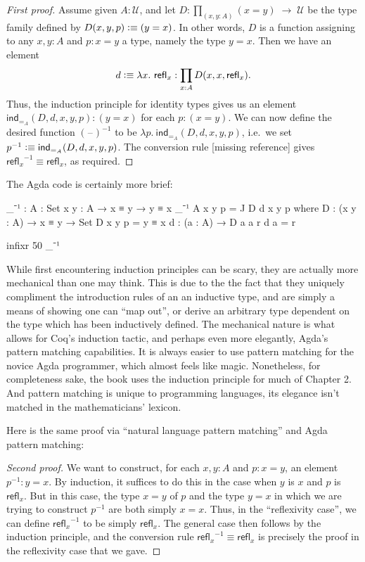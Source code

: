 \documentclass[11pt, a4paper]{article}
\newtheorem{proof}{Proof}
\newcommand{\jdeq}{\equiv}      %
\newcommand{\refl}[1]{\ensuremath{\mathsf{refl}_{#1}}\xspace}
\newcommand{\defeq}{\vcentcolon\equiv}  %
\newcommand{\ind}[1]{\mathsf{ind}_{#1}}
\newcommand{\indid}[1]{\ind{=_{#1}}} %
\newcommand{\blank}{\mathord{\hspace{1pt}\text{--}\hspace{1pt}}}
\newcommand{\opp}[1]{\mathord{{#1}^{-1}}}
\newcommand{\UU}{\ensuremath{\mathcal{U}}\xspace}
\let\type\UU
\begin{document}
\begin{proof}[First proof]
  Assume given $A:\UU$, and
  let $D:{\textstyle\prod_{(x,y:A)}}(x= y) \; \to \; \type$ be the type family defined by $D(x,y,p)\defeq (y= x)$.
  In other words, $D$ is a function assigning to any $x,y:A$ and $p:x=y$ a type, namely the type $y=x$.
  Then we have an element
  \begin{equation*}
    d\defeq \lambda x.\ \refl{x}:\prod_{x:A} D(x,x,\refl{x}).
  \end{equation*}
  Thus, the induction principle for identity types gives us an element
  $\indid{A}(D,d,x,y,p): (y= x)$
  for each $p:(x= y)$.
  We can now define the desired function $\opp{(\blank)}$ to be 
  $\lambda p.\ \indid{A}(D,d,x,y,p)$, 
  i.e.\ we set 
  $\opp{p} \defeq \indid{A}(D,d,x,y,p)$.
  The conversion rule [missing reference] %
  gives $\opp{\refl{x}}\jdeq \refl{x}$, as required.
\end{proof}
The Agda code is certainly more brief: 
\begin{code}

  _⁻¹ : {A : Set} {x y : A} → x ≡ y → y ≡ x
  _⁻¹ {A} {x} {y} p = J D d x y p
    where
      D : (x y : A) → x ≡ y → Set
      D x y p = y ≡ x
      d : (a : A) → D a a r
      d a = r

  infixr 50 _⁻¹

\end{code}

While first encountering induction principles can be scary, they are actually
more mechanical than one may think. This is due to the the fact that they
uniquely compliment the introduction rules of an an inductive type, and are
simply a means of showing one can ``map out'', or derive an arbitrary type
dependent on the type which has been inductively defined. The mechanical nature
is what allows for Coq's induction tactic, and perhaps even more elegantly,
Agda's pattern matching capabilities. It is always easier to use pattern
matching for the novice Agda programmer, which almost feels like magic.
Nonetheless, for completeness sake, the book uses the induction principle for
much of Chapter 2. And pattern matching is unique to programming languages,
its elegance isn't matched in the mathematicians' lexicon.

Here is the same proof via ``natural language pattern matching'' and Agda
pattern matching:

\begin{proof}[Second proof]
  We want to construct, for each $x,y:A$ and $p:x=y$, an element $\opp{p}:y=x$.
  By induction, it suffices to do this in the case when $y$ is $x$ and $p$ is $\refl{x}$.
  But in this case, the type $x=y$ of $p$ and the type $y=x$ in which we are trying to construct $\opp{p}$ are both simply $x=x$.
  Thus, in the ``reflexivity case'', we can define $\opp{\refl{x}}$ to be simply $\refl{x}$.
  The general case then follows by the induction principle, and the conversion rule $\opp{\refl{x}}\jdeq\refl{x}$ is precisely the proof in the reflexivity case that we gave.
\end{proof}
\end{document}
